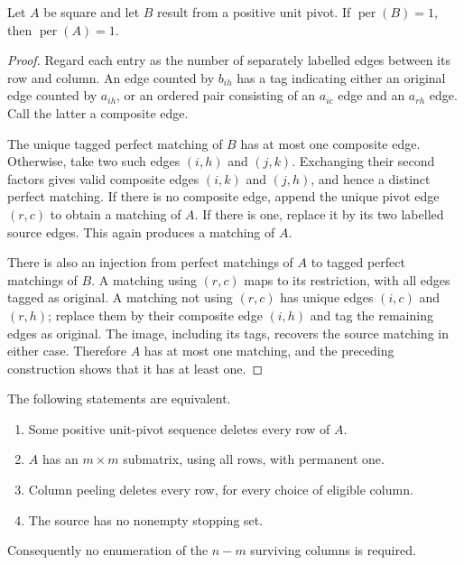 \begin{lemma}
\label{lem:reverse-positive-pivot-self-contained}
Let $A$ be square and let $B$ result from a positive unit pivot.  If
$\operatorname{per}(B)=1$, then $\operatorname{per}(A)=1$.
\end{lemma}
\begin{proof}
Regard each entry as the number of separately labelled edges between its row
and column.  An edge counted by $b_{ih}$ has a tag indicating either an
original edge counted by $a_{ih}$, or an ordered pair consisting of an
$a_{ic}$ edge and an $a_{rh}$ edge.  Call the latter a composite edge.

The unique tagged perfect matching of $B$ has at most one composite edge.
Otherwise, take two such edges $(i,h)$ and $(j,k)$.  Exchanging their second
factors gives valid composite edges $(i,k)$ and $(j,h)$, and hence a distinct
perfect matching.  If there is no composite edge, append the unique pivot
edge $(r,c)$ to obtain a matching of $A$.  If there is one, replace it by
its two labelled source edges.  This again produces a matching of $A$.

There is also an injection from perfect matchings of $A$ to tagged perfect
matchings of $B$.  A matching using $(r,c)$ maps to its restriction, with all
edges tagged as original.  A matching not using $(r,c)$ has unique edges
$(i,c)$ and $(r,h)$; replace them by their composite edge $(i,h)$ and tag the
remaining edges as original.  The image, including its tags, recovers the
source matching in either case.  Therefore $A$ has at most one matching,
and the preceding construction shows that it has at least one.
\end{proof}

\begin{theorem}
\label{thm:column-peeling}
The following statements are equivalent.
\begin{enumerate}
\item Some positive unit-pivot sequence deletes every row of $A$.
\item $A$ has an $m\times m$ submatrix, using all rows, with permanent one.
\item Column peeling deletes every row, for every choice of eligible column.
\item The source has no nonempty stopping set.
\end{enumerate}
Consequently no enumeration of the $n-m$ surviving columns is required.
\end{theorem}

